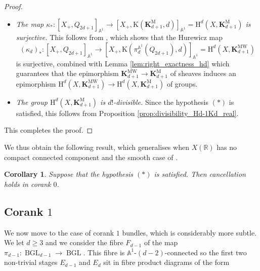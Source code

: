 \documentclass[11pt,leqno]{amsart}
\renewcommand{\1}{{\rm 1\hspace*{-0.4ex}%
\rule{0.1ex}{1.52ex}\hspace*{0.2ex}}}
\newcommand{\Hr}{{\mathrm {H}}}
\newcommand{\<}[1]{{\langle}#1 {\rangle}}
\newcommand{\Rb}{\mathbb{R}}
\newcommand{\Kr}{\mathrm{K}}
\newcommand{\Kbf}{\mathbf{K}}
\newcommand{\Abb}{\mathbb{A}}
\newcommand{\BGL}{\operatorname{BGL}}
\newcommand{\Mr}{\mathrm{M}}
\newcommand{\Br}{\mathrm{B}}
\newcommand{\MW}{\mathrm{MW}}
\theoremstyle{plain}
\newtheorem{cor}[thm]{Corollary}
\theoremstyle{definition}
\theoremstyle{remark}
\numberwithin{equation}{section}
\begin{document}
\begin{proof}
\begin{itemize}
    \item \emph{The map $\kappa_*:[X_+,Q_{2d+1}]_{\Abb^1}\to[X_+,\Kr(\Kbf_{d+1}^\Mr,d)]_{\Abb^1}=\Hr^d(X,\Kbf_{d+1}^\Mr)$ is surjective.} This follows from \cite[Proposition 1.2.6]{asokEulerClassGroups2021}, which shows that the Hurewicz map \[(\kappa_d)_*:[X_+,Q_{2d+1}]_{\Abb^1}\to[X_+,\Kr(\pi_{d}^{\Abb^1}(Q_{2d+1}),d)]_{\Abb^1}=\Hr^d(X,\Kbf_{d+1}^\MW)\] is surjective, combined with Lemma \ref{lem:right_exactness_hd} which guarantees that the epimorphism $\Kbf_{d+1}^\MW\to\Kbf_{d+1}^\Mr$ of sheaves induces an epimorphism $\Hr^d(X,\Kbf_{d+1}^\MW)\to\Hr^d(X,\Kbf_{d+1}^\Mr)$ of groups.
    \item \emph{The group $\Hr^d(X,\Kbf_{d+1}^\Mr)$ is $d!$-divisible.} Since the hypothesis $(*)$ is satisfied, this follows from Proposition \ref{prop:divisibility_Hd-1Kd_real}.
\end{itemize}
This completes the proof.
\end{proof}

We thus obtain the following result, which generalises  \cite[Theorems 4.11 and 4.15]{dasOrbitSpacesUnimodular2018} when $X(\Rb)$ has no compact connected component and the smooth case of \cite[Theorem 2.8]{banerjeeZeroCyclesMennicke2025}.

\begin{cor}
Suppose that the hypothesis $(*)$ is satisfied. Then cancellation holds in corank $0$.
\end{cor}

\subsection{Corank $1$}

We now move to the case of corank $1$ bundles, which is considerably more subtle. We let $d\geq 3$ and we consider the fibre $F_{d-1}$ of the map $\pi_{d-1}:\BGL_{d-1}\to\BGL$. This fibre is $\Abb^1$-$(d-2)$-connected so the first two non-trivial stages $E_{d-1}$ and $E_d$ sit in fibre product diagrams of the form
\begin{center}
\end{center}
\end{document}
